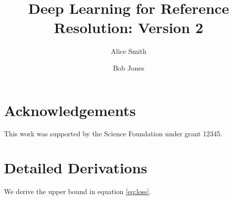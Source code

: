\documentclass{article}
\begin{document}
\title{Deep Learning for Reference Resolution: Version 2}
\author{Alice Smith \and Bob Jones}
\maketitle




\section*{Acknowledgements}
This work was supported by the Science Foundation under grant 12345.

\appendix
\section{Detailed Derivations}
We derive the upper bound in equation \eqref{eq:loss}.



\end{document}
